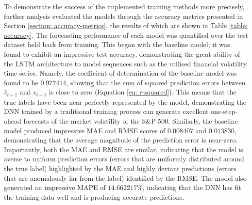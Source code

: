 \documentclass[a4paper, 11pt]{report}
\begin{document}
    To demonstrate the success of the implemented training methods more precisely, further analysis evaluated the models through the accuracy metrics presented in Section \ref{section: accuracy-metrics}, the results of which are shown in Table \ref{table: accuracy}. The forecasting performance of each model was quantified over the test dataset held back from training. This began with the baseline model; it was found to exhibit an impressive test accuracy, demonstrating the great ability of the LSTM architecture to model sequences such as the utilised financial volatility time series. Namely, the coefficient of determination of the baseline model was found to be $0.977414$, showing that the sum of squared prediction errors between $\hat{v}_{t+1}$ and $v_{t+1}$ is close to zero (Equation \ref{eq: r-squared}). This means that the true labels have been near-perfectly represented by the model, demonstrating the DNN trained by a traditional training process can generate excellent one-step-ahead forecasts of the market volatility of the S\&P 500. Similarly, the baseline model produced impressive MAE and RMSE scores of $0.008407$ and $0.013830$, demonstrating that the average magnitude of the prediction error is near-zero. Importantly, both the MAE and RMSE are similar, indicating that the model is averse to uniform prediction errors (errors that are uniformly distributed around the true label) highlighted by the MAE and highly deviant predictions (errors that are anomalously far from the label) identified by the RMSE. The model also generated an impressive MAPE of $14.662217\%$, indicating that the DNN has fit the training data well and is producing accurate predictions.
\end{document}
